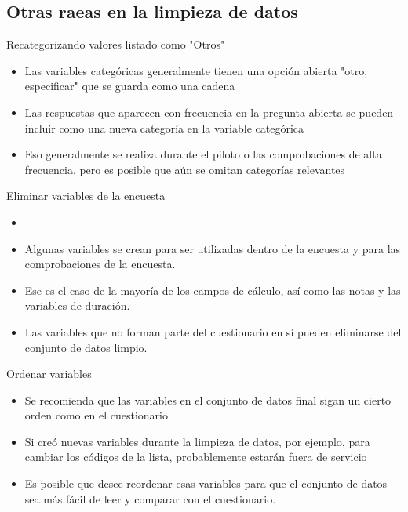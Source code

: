 \documentclass[10pt, aspectratio=169, compress]{beamer}
\begin{document}
\subsection{Otras raeas en la limpieza de datos}
\begin{frame}[t]{Recategorizando valores listado como "Otros"}
	\begin{itemize}
		\item Las variables categóricas generalmente tienen una opción abierta "otro, especificar" que se guarda como una cadena
		\item Las respuestas que aparecen con frecuencia en la pregunta abierta se pueden incluir como una nueva categoría en la variable categórica
		\item Eso generalmente se realiza durante el piloto o las comprobaciones de alta frecuencia, pero es posible que aún se omitan categorías relevantes
	\end{itemize}
\end{frame}
\begin{frame}[t]{Eliminar variables de la encuesta}
	\begin{itemize}
		\item \item Algunas variables se crean para ser utilizadas dentro de la encuesta y para las comprobaciones de la encuesta.
		\item Ese es el caso de la mayoría de los campos de cálculo, así como las notas y las variables de duración.
		\item Las variables que no forman parte del cuestionario en sí pueden eliminarse del conjunto de datos limpio.
	\end{itemize}
\end{frame}
\begin{frame}[t]{Ordenar variables}
	\begin{itemize}
		\item Se recomienda que las variables en el conjunto de datos final sigan un cierto orden como en el cuestionario
		\item Si creó nuevas variables durante la limpieza de datos, por ejemplo, para cambiar los códigos de la lista, probablemente estarán fuera de servicio
		\item Es posible que desee reordenar esas variables para que el conjunto de datos sea más fácil de leer y comparar con el cuestionario.
	\end{itemize}
\end{frame}
\end{document}
